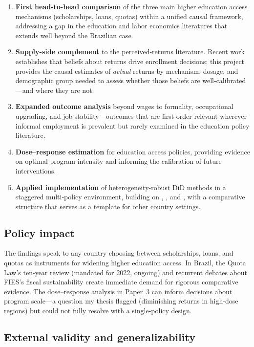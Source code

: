 \documentclass[a4paper,11pt]{article}
\begin{document}
\begin{enumerate}[nosep]
    \item \textbf{First head-to-head comparison} of the three main higher education access mechanisms (scholarships, loans, quotas) within a unified causal framework, addressing a gap in the education and labor economics literatures that extends well beyond the Brazilian case.
    \item \textbf{Supply-side complement} to the perceived-returns literature. Recent work establishes that beliefs about returns drive enrollment decisions; this project provides the causal estimates of \textit{actual} returns by mechanism, dosage, and demographic group needed to assess whether those beliefs are well-calibrated---and where they are not.
    \item \textbf{Expanded outcome analysis} beyond wages to formality, occupational upgrading, and job stability---outcomes that are first-order relevant wherever informal employment is prevalent but rarely examined in the education policy literature.
    \item \textbf{Dose--response estimation} for education access policies, providing evidence on optimal program intensity and informing the calibration of future interventions.
    \item \textbf{Applied implementation} of heterogeneity-robust DiD methods in a staggered multi-policy environment, building on \citet{callaway2021}, \citet{dechaisemartin2020}, and \citet{sun2021}, with a comparative structure that serves as a template for other country settings.
\end{enumerate}

\subsection{Policy impact}

The findings speak to any country choosing between scholarships, loans, and quotas as instruments for widening higher education access. In Brazil, the Quota Law's ten-year review (mandated for 2022, ongoing) and recurrent debates about FIES's fiscal sustainability create immediate demand for rigorous comparative evidence. The dose--response analysis in Paper~3 can inform decisions about program scale---a question my thesis flagged (diminishing returns in high-dose regions) but could not fully resolve with a single-policy design.

\subsection{External validity and generalizability}
\end{document}
